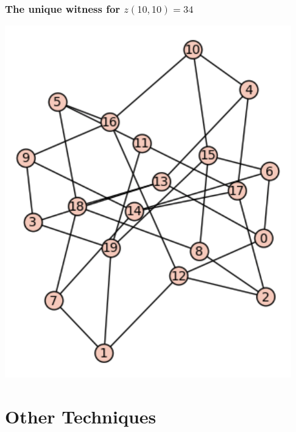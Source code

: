 \documentclass[pdf,hyperref={urlbordercolor={0 1 1}},xcolor=pdftex,dvipsnames]{beamer}
\begin{document}
\begin{frame}
  \frametitle{The unique witness for $z(10,10)=34$}
  \begin{center}
    \begin{minipage}[c]{.47\textwidth}
      \includegraphics[scale=.5]{figs/b20z34.pdf}
    \end{minipage}
    \begin{minipage}[c]{.47\textwidth}
      \begin{center}
        {
          \begin{tikzpicture}[scale=.5]
            
          \end{tikzpicture}
        }
      \end{center}
    \end{minipage}
  \end{center}
\end{frame}

\section{Other Techniques}
\end{document}
